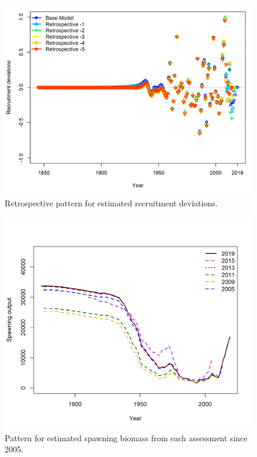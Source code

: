 \documentclass[12pt,]{article}
\begin{document}
\begin{figure}
\centering
\includegraphics{Figures/retro_recdevs.png}
\caption{Retrospective pattern for estimated recruitment deviations.
\label{fig:retro_recdev}}
\end{figure}

\FloatBarrier

\begin{figure}
\centering
\includegraphics{Figures/Assessment_History.png}
\caption{Pattern for estimated spawning biomass from each assessment
since 2005. \label{fig:historical_analysis}}
\end{figure}
\end{document}
